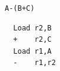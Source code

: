 \documentclass{jarticle}
\begin{document}
\verb|A-(B+C)|
\begin{Verbatim}
  Load r2,B
  +    r2,C
  Load r1,A
  -    r1,r2
\end{Verbatim}
\end{document}

